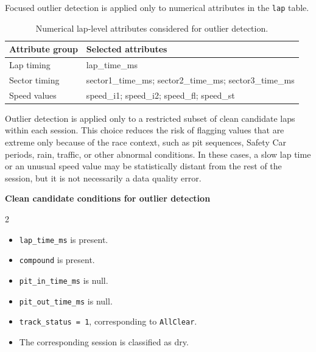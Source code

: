 \documentclass[11pt,a4paper]{article}
\begin{document}
	Focused outlier detection is applied only to numerical attributes in the \texttt{lap} table. 

	
	\begin{table}[H]
		\centering
		\small
		\caption{Numerical lap-level attributes considered for outlier detection.}
		\label{tab:outlier-selected-attributes}
		\begin{tabularx}{0.85\linewidth}{
				>{\raggedright\arraybackslash}p{4.0cm}
				>{\raggedright\arraybackslash}X
			}
			\toprule
			\textbf{Attribute group}
			& \textbf{Selected attributes} \\
			\midrule
			
			Lap timing
			& lap\_time\_ms \\
			
			\midrule
			
			Sector timing
			& sector1\_time\_ms; sector2\_time\_ms; sector3\_time\_ms \\
			
			\midrule
			
			Speed values
			& speed\_i1; speed\_i2; speed\_fl; speed\_st \\
			
			\bottomrule
		\end{tabularx}
	\end{table}
	
	Outlier detection is applied only to a restricted subset of clean candidate laps within each session. 
	This choice reduces the risk of flagging values that are extreme only because of the race context, such as pit sequences, Safety Car periods, rain, traffic, or other abnormal conditions. 
	In these cases, a slow lap time or an unusual speed value may be statistically distant from the rest of the session, but it is not necessarily a data quality error.
	
	\vspace{1em}
	\noindent\textbf{Clean candidate conditions for outlier detection}
	
	\begin{multicols}{2}
		\begin{itemize}[leftmargin=*, noitemsep]
			\item \texttt{lap\_time\_ms} is present.
			\item \texttt{compound} is present.
			\item \texttt{pit\_in\_time\_ms} is null.
			\item \texttt{pit\_out\_time\_ms} is null.
			\item \texttt{track\_status = 1}, corresponding to \texttt{AllClear}.
			\item The corresponding session is classified as dry.
		\end{itemize}
	\end{multicols}
	
\end{document}
